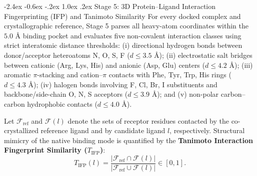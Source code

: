 \documentclass[11pt,a4paper]{article}
\makeatletter
\renewcommand{\subsection}{\@startsection{subsection}{2}{\z@}%
  {-2.4ex \@plus -0.6ex \@minus -.2ex}%
  {1.0ex \@plus .2ex}%
  {\normalfont\large\bfseries\color{primary}}}
\makeatother
\begin{document}
\subsection{Stage 5: 3D Protein--Ligand Interaction Fingerprinting (IFP) and Tanimoto Similarity}
\noindent For every docked complex and crystallographic reference, Stage 5 parses all heavy-atom coordinates within the $5.0\text{ \AA}$ binding pocket and evaluates five non-covalent interaction classes using strict interatomic distance thresholds: (i) directional hydrogen bonds between donor/acceptor heteroatoms N, O, S, F ($d \le 3.5\text{ \AA}$); (ii) electrostatic salt bridges between cationic (Arg, Lys, His) and anionic (Asp, Glu) centers ($d \le 4.2\text{ \AA}$); (iii) aromatic $\pi$-stacking and cation--$\pi$ contacts with Phe, Tyr, Trp, His rings ($d \le 4.3\text{ \AA}$); (iv) halogen bonds involving F, Cl, Br, I substituents and backbone/side-chain O, N, S acceptors ($d \le 3.9\text{ \AA}$); and (v) non-polar carbon--carbon hydrophobic contacts ($d \le 4.0\text{ \AA}$).

Let $\mathcal{F}_{\text{ref}}$ and $\mathcal{F}(l)$ denote the sets of receptor residues contacted by the co-crystallized reference ligand and by candidate ligand $l$, respectively. Structural mimicry of the native binding mode is quantified by the \textbf{Tanimoto Interaction Fingerprint Similarity ($T_{\text{IFP}}$)}:
\begin{equation}
T_{\text{IFP}}(l) = \frac{|\mathcal{F}_{\text{ref}} \cap \mathcal{F}(l)|}{|\mathcal{F}_{\text{ref}} \cup \mathcal{F}(l)|} \in [0, 1].
\label{eq:ifp}
\end{equation}
\end{document}
